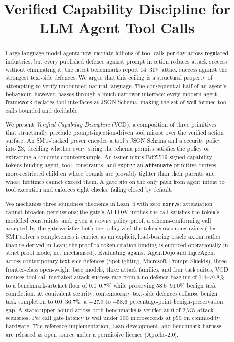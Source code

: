 \documentclass[conference]{IEEEtran}
\title{Verified Capability Discipline for LLM Agent Tool Calls}
\author{
  \IEEEauthorblockN{[Anonymised for double-blind submission]}
}
\begin{document}
\maketitle

\begin{abstract}
Large language model agents now mediate billions of tool calls per day across regulated industries, but every published defence against prompt injection reduces attack success without eliminating it: the latest benchmarks report 14--31\% attack success against the strongest text-side defences. We argue that this ceiling is a structural property of attempting to verify unbounded natural language. The consequential half of an agent's behaviour, however, passes through a much narrower interface: every modern agent framework declares tool interfaces as JSON Schema, making the set of well-formed tool calls bounded and decidable.

We present \emph{Verified Capability Discipline} (VCD), a composition of three primitives that structurally preclude prompt-injection-driven tool misuse over the verified action surface. An SMT-backed prover encodes a tool's JSON Schema and a security policy into Z3, deciding whether every string the schema permits satisfies the policy or extracting a concrete counterexample. An issuer mints Ed25519-signed capability tokens binding agent, tool, constraints, and expiry; an \texttt{attenuate} primitive derives more-restricted children whose bounds are provably tighter than their parents and whose lifetimes cannot exceed them. A gate sits on the only path from agent intent to tool execution and enforces eight checks, failing closed by default.

We mechanise three soundness theorems in Lean~4 with zero \texttt{sorry}s: attenuation cannot broaden permissions; the gate's ALLOW implies the call satisfies the token's modelled constraints; and, given a \textsc{proven} policy proof, a schema-conforming call accepted by the gate satisfies both the policy and the token's own constraints (the SMT solver's completeness is carried as an explicit, load-bearing oracle axiom rather than re-derived in Lean; the proof-to-token citation binding is enforced operationally in strict proof mode, not mechanised). Evaluating against AgentDojo and InjecAgent across contemporary text-side defences (Spotlighting, Microsoft Prompt Shields), three frontier-class open-weight base models, three attack families, and four task suites, VCD reduces tool-call-mediated attack-success rate from a no-defence baseline of 1.4--70.8\% to a benchmark-artefact floor of 0.0--0.7\% while preserving 58.6--91.0\% benign task completion. At equivalent security, contemporary text-side defences collapse benign task completion to 0.0--36.7\%, a +27.9 to +58.6 percentage-point benign-preservation gap. A static upper bound across both benchmarks is verified at 0 of 2{,}737 attack scenarios. Per-call gate latency is well under 100 microseconds at p50 on commodity hardware. The reference implementation, Lean development, and benchmark harness are released as open source under a permissive licence (Apache-2.0).
\end{abstract}
\end{document}

